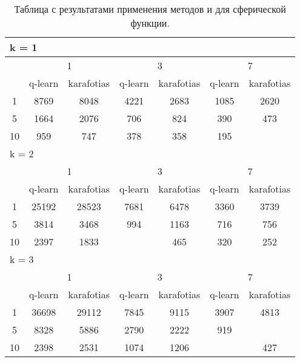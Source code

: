 \begin{table}
  \centering
  \begin{tabular}{|*7{c|}}
    \hline
    \multicolumn{7}{|l|}{k = 1} \\
    \hline
    \multirow{2}{*}{\diagbox{$\mu$}{$\lambda$}} & \multicolumn{2}{c|}{1} & \multicolumn{2}{c|}{3} & \multicolumn{2}{c|}{7} \\
    \cline{2-7}
    & q-learn & karafotias & q-learn & karafotias & q-learn & karafotias \\
    \hline
    1 & 8769 & 8048 & 4221 & 2683 & 1085 & 2620 \\
    \hline
    5 & 1664 & 2076 & 706 & 824 & 390 & 473 \\
    \hline
    10 & 959& 747 & 378 & 358 & 195 & \cellcolor{olive}{167} \\
    \hline
    \multicolumn{7}{|l|}{k = 2} \\
    \hline
    \multirow{2}{*}{\diagbox{$\mu$}{$\lambda$}} & \multicolumn{2}{c|}{1} & \multicolumn{2}{c|}{3} & \multicolumn{2}{c|}{7} \\
    \cline{2-7}
    & q-learn & karafotias & q-learn & karafotias & q-learn & karafotias \\
    \hline
    1 & 25192 & 28523 & 7681 & 6478 & 3360 & 3739 \\
    \hline
    5 & 3814 & 3468 & 994 & 1163 & 716 & 756 \\
    \hline
    10 & 2397 & 1833& \cellcolor{olive}{445} & 465 & 320 & 252 \\
    \hline
    \multicolumn{7}{|l|}{k = 3} \\
    \hline
    \multirow{2}{*}{\diagbox{$\mu$}{$\lambda$}} & \multicolumn{2}{c|}{1} & \multicolumn{2}{c|}{3} & \multicolumn{2}{c|}{7} \\
    \cline{2-7}
    & q-learn & karafotias & q-learn & karafotias & q-learn & karafotias \\
    \hline
    1 & 36698 & 29112 & 7845 & 9115 & 3907 & 4813 \\
    \hline
    5 & 8328 & 5886 & 2790 & 2222 & 919 & \cellcolor{olive}{777} \\
    \hline
    10 & 2398 & 2531 & 1074 & 1206& \cellcolor{olive}{391} & 427 \\
    \hline
    \end{tabular}
  \captionsetup{justification=centering}
  \caption{Таблица с результатами применения методов  и  для сферической функции.}
  \label{q_sphere_results}
\end{table}

